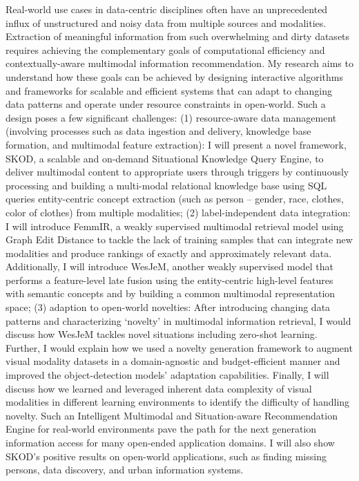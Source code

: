 \noindent {}
Real-world use cases in data-centric disciplines often have an unprecedented influx of unstructured and noisy data from multiple sources and modalities. Extraction of meaningful information from such overwhelming and dirty datasets requires achieving the complementary goals of computational efficiency and contextually-aware multimodal information recommendation. My research aims to understand how these goals can be achieved by designing interactive algorithms and frameworks for scalable and efficient systems that can adapt to changing data patterns and operate under resource constraints in open-world. Such a design poses a few significant challenges: (1) resource-aware data management (involving processes such as data ingestion and delivery, knowledge base formation, and multimodal feature extraction): I will present a novel framework, SKOD, a scalable and on-demand Situational Knowledge Query Engine, to deliver multimodal content to appropriate users through triggers by continuously processing and building a multi-modal relational knowledge base using SQL queries entity-centric concept extraction (such as person – gender, race, clothes, color of clothes) from multiple modalities; (2) label-independent data integration: I will introduce FemmIR, a weakly supervised multimodal retrieval model using Graph Edit Distance to tackle the lack of training samples that can integrate new modalities and produce rankings of exactly and approximately relevant data. Additionally, I will introduce WesJeM, another weakly supervised model that performs a feature-level late fusion using the entity-centric high-level features with semantic concepts and by building a common multimodal representation space; (3) adaption to open-world novelties: After introducing changing data patterns and characterizing ‘novelty’ in multimodal information retrieval, I would discuss how WesJeM tackles novel situations including zero-shot learning. Further, I would explain how we used a novelty generation framework to augment visual modality datasets in a domain-agnostic and budget-efficient manner and improved the object-detection models’ adaptation capabilities. Finally, I will discuss how we learned and leveraged inherent data complexity of visual modalities in different learning environments to identify the difficulty of handling novelty. Such an Intelligent Multimodal and Situation-aware Recommendation Engine for real-world environments pave the path for the next generation information access for many open-ended application domains. I will also show SKOD’s positive results on open-world applications, such as finding missing persons, data discovery, and urban information systems.
 